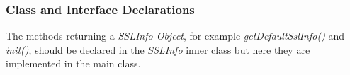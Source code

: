
\subsubsection{Class and Interface Declarations}
\begin{itemize}
		The methods returning a \textit{SSLInfo Object}, for example \textit{getDefaultSslInfo()} and \textit{init()}, should be declared in the \textit{SSLInfo} inner class but here they are implemented in the main class. 

\end{itemize}
